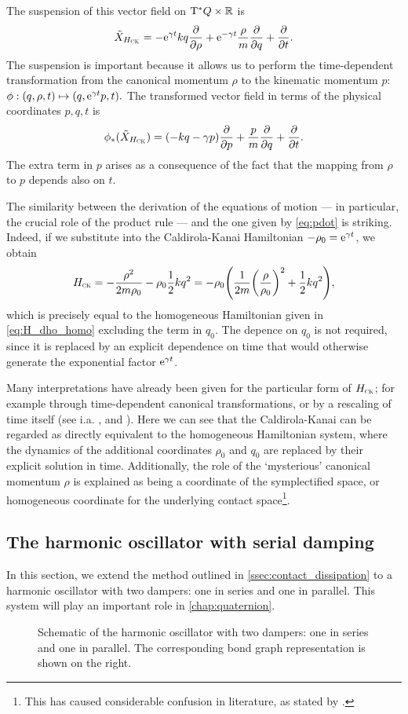 The suspension of this vector field on $\mathrm{T}^*Q\times \mathbb{R}$ is
$$ \tilde{X}_{H_\text{\tiny{\textsc{CK}}}} = -\mathrm{e}^{\gamma t}kq\pdv{}{\ensuremath{\rho}} + \mathrm{e}^{-\gamma t}\frac{\rho}{m}\pdv{}{q} + \pdv{}{t}.$$
The suspension is important because it allows us to perform the time-dependent transformation from the canonical momentum $\rho$ to the kinematic momentum $p$:
$\phi: (q, \rho, t) \mapsto (q, \mathrm{e}^{\gamma t}p, t).$
The transformed vector field in terms of the physical coordinates $p, q, t$ is
$$ \phi_*(\tilde{X}_{H_\text{\tiny{\textsc{CK}}}}) = \qty(-kq - \gamma p)\pdv{}{p} + \frac{p}{m}\pdv{}{q} + \pdv{}{t}.$$
The extra term in $p$ arises as a consequence of the fact that the mapping from $\rho$ to $p$ depends also on $t$. 

The similarity between the derivation of the equations of motion --- in particular, the crucial role of the product rule --- and the one given by \cref{eq:pdot} is striking. Indeed, if we substitute into the Caldirola-Kanai Hamiltonian $-\rho_0 = \mathrm{e}^{\gamma t}$, we obtain
$$ H_\text{\tiny{\textsc{CK}}} = -\frac{\rho^2}{2m\rho_0} - \rho_0 \frac{1}{2}kq^2 = -\rho_0 \qty (\frac{1}{2m}\qty(\frac{\rho}{\rho_0})^2 + \frac{1}{2}kq^2), $$
which is precisely equal to the homogeneous Hamiltonian given in \cref{eq:H_dho_homo} excluding the term in $q_0$. The depence on $q_0$ is not required, since it is replaced by an explicit dependence on time that would otherwise generate the exponential factor $\mathrm{e}^{\gamma t}$. 

Many interpretations have already been given for the particular form of $H_\text{\tiny{\textsc{CK}}}$; for example through time-dependent canonical transformations, or by a rescaling of time itself (see i.a. \citet{Tokieda2021}, \citet{Caldirola1941} and \citet{Bravetti2017}). Here we can see that the Caldirola-Kanai can be regarded as  directly equivalent to the homogeneous Hamiltonian system, where the dynamics of the additional coordinates $\rho_0$ and $q_0$ are replaced by their explicit solution in time. Additionally, the role of the `mysterious' canonical momentum $\rho$ is explained as being a coordinate of the symplectified space, or homogeneous coordinate for the underlying contact space\footnote{This has caused considerable confusion in literature, as stated by \citet{Schuch1997}.}.

\subsection{The harmonic oscillator with serial damping}
In this section, we extend the method outlined in \cref{ssec:contact_dissipation} to a harmonic oscillator with two dampers: one in series and one in parallel. This system will play an important role in \cref{chap:quaternion}.
\begin{figure}[ht!]
    \centering
    
    \caption{Schematic of the harmonic oscillator with two dampers: one in series and one in parallel. The corresponding bond graph representation is shown on the right.}
    \label{fig:double_damped_osc}
\end{figure}

